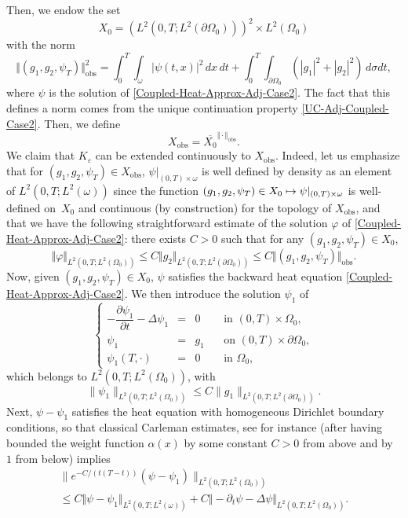 \documentclass[10pt,a4paper]{amsart}
\newcommand\mto{\mathchoice{\longmapsto}{\mapsto}{\mapsto}{\mapsto}}
\newcommand{\obs}{\mathrm{obs}}
\newcommand{\norm}[1]{\Vert#1\Vert}
\theoremstyle{definition}
\begin{document}
Then, we endow the set
\[
X_{0} = (L^2(0,T; L^2(\partial \Omega_0)))^2 \times L^2(\Omega_0)
\]
with the norm
\[
\norm{(g_1, g_2, \psi_T)}_{\obs}^2
=
\int_0^T \int_\omega |\psi(t,x)|^2 \, dx\,dt
+
\int_0^T \int_{\partial \Omega_0} \left(| g_1|^2 + |g_2|^2 \right) \, d\sigma dt,
\]
where $\psi$ is the solution of \eqref{Coupled-Heat-Approx-Adj-Case2}. The fact that this defines a norm comes from the unique continuation property \eqref{UC-Adj-Coupled-Case2}. Then, we define\begin{equation*}
X_{\obs} = \overline{X_{0}}^{\norm{\cdot}_{\obs}}.
\end{equation*}
We claim that $K_\varepsilon$ can be extended continuously to $X_{\obs}$. Indeed, let us emphasize that for $(g_1, g_2, \psi_T) \in X_{\obs}$, $\psi|_{(0,T) \times \omega}$ is well defined by density as an element of $L^2(0,T;L^2(\omega))$ since the function $(g_1, g_2, \psi_T) \in X_{0} \mto \psi|_{(0,T) \times \omega}$ is well-defined on~$X_0$ and continuous (by construction) for the topology of $X_{\obs}$, and that we have the following straightforward estimate of the solution $\varphi$ of \eqref{Coupled-Heat-Approx-Adj-Case2}: there exists $C>0$ such that for any $(g_1, g_2, \psi_T) \in X_{0}$,
\begin{equation}
\label{Est-Varphi-Direct}
\norm{ \varphi }_{L^2(0,T; L^2(\Omega_0))} \leq C \norm{ g_2}_{L^2(0,T; L^2(\partial \Omega_0))} \leq C \norm{(g_1, g_2, \psi_T)}_{\obs}.
\end{equation}
Now, given $(g_1, g_2, \psi_T) \in X_0$, $\psi$ satisfies the backward heat equation \eqref{Coupled-Heat-Approx-Adj-Case2}. We then introduce the solution $\psi_1$ of
\[
\left\{
\begin{array}{rcll}
- \dfrac{\partial \psi_1}{\partial t}-\Delta \psi_1 &=& 0 \quad&\text{ in }(0,T) \times \Omega_0,
\\
\psi_1 &=& g_1 &\text{ on }(0,T) \times \partial \Omega_0,
\\
\psi_1 \left(T,\cdot\right) &=& 0 &\text{ in }\Omega_0,
\end{array}
\right.
\]
which belongs to $L^2(0,T; L^2(\Omega_0))$, with
\[
\| \psi_1 \|_{L^2(0,T; L^2(\Omega_0))} \leq C \| g_1\|_{ L^2(0,T; L^2(\partial \Omega_0))}.
\]
Next, $\psi - \psi_1$ satisfies the heat equation with homogeneous Dirichlet boundary conditions, so that classical Carleman estimates, see for instance \cite[Th.\,9.4.1]{TWBook} (after having bounded the weight function $\alpha(x)$ by some constant $C>0$ from above and by $1$ from below) implies
\begin{multline*}
\| e^{-C/(t(T-t))} (\psi - \psi_1) \|_{L^2(0,T; L^2(\Omega_0))}\\
\leq
C \norm{\psi- \psi_1}_{L^2(0,T; L^2(\omega))}
+
{C\norm{ - \partial_t \psi - \Delta \psi }_{L^2(0,T; L^2(\Omega_0))}}.
\end{multline*}
\end{document}
